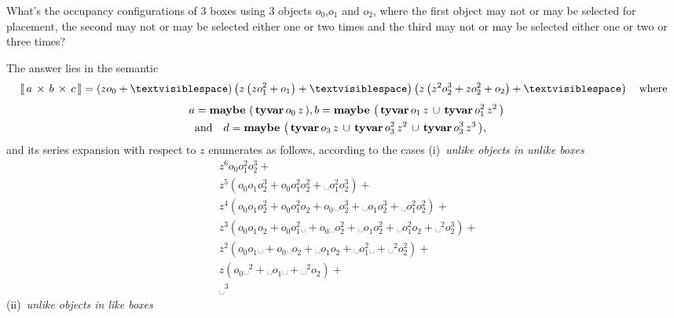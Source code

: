 \begin{example}
What's the occupancy configurations of $3$ boxes using $3$ objects
$o_{0}$,$o_{1}$ and $o_{2}$, where the first object may not or may be selected
for placement, the second may not or may be selected either one or two times
    and the third may not or may be selected either one or two or three times?

The answer lies in the semantic
\begin{displaymath}
    \semantic{\tycp{a}{\tycp{b}{c}}} = \left(z o_{0} + ␣\right) \left(z \left(z o_{1}^{2} + o_{1}\right) + ␣\right) \left(z \left(z^{2} o_{2}^{3} + z o_{2}^{2} + o_{2}\right) + ␣\right)
    \quad\text{where}
\end{displaymath}
\begin{displaymath}
\begin{split}
a&={\textbf{maybe}\,\left(\,\textbf{tyvar}\,o_{0}\,z\,\right)}, b={\textbf{maybe}\,\left(\,\textbf{tyvar}\,o_{1}\,z\,\cup\,\textbf{tyvar}\,o_{1}^{2}\,z^{2}\,\right)}\\
\quad&\text{and}\quad d={\textbf{maybe}\,\left(\,\textbf{tyvar}\,o_{3}\,z\,\cup\,\textbf{tyvar}\,o_{3}^{2}\,z^{2}\,\cup\,\textbf{tyvar}\,o_{3}^{3}\,z^{3}\,\right)},
\end{split}
\end{displaymath}
and its series expansion with respect to $z$ enumerates as follows,
according to the cases (i)~\textit{unlike objects in unlike boxes}
\begin{displaymath}
\begin{split}
&z^{6} o_{0} o_{1}^{2} o_{2}^{3} + \\
&z^{5} \left(o_{0} o_{1} o_{2}^{3} + o_{0} o_{1}^{2} o_{2}^{2} + ␣ o_{1}^{2} o_{2}^{3}\right) + \\
&z^{4} \left(o_{0} o_{1} o_{2}^{2} + o_{0} o_{1}^{2} o_{2} + o_{0} ␣ o_{2}^{3} + ␣ o_{1} o_{2}^{3} + ␣ o_{1}^{2} o_{2}^{2}\right) + \\
&z^{3} \left(o_{0} o_{1} o_{2} + o_{0} o_{1}^{2} ␣ + o_{0} ␣ o_{2}^{2} + ␣ o_{1} o_{2}^{2} + ␣ o_{1}^{2} o_{2} + ␣^{2} o_{2}^{3}\right) + \\
&z^{2} \left(o_{0} o_{1} ␣ + o_{0} ␣ o_{2} + ␣ o_{1} o_{2} + ␣ o_{1}^{2} ␣ + ␣^{2} o_{2}^{2}\right) + \\
&z \left(o_{0} ␣^{2} + ␣ o_{1} ␣ + ␣^{2} o_{2}\right) + \\
&␣^{3}
\end{split}
\end{displaymath}
(ii)~\textit{unlike objects in like boxes}
\begin{displaymath}
\begin{split}

\end{split}
\end{displaymath}
\end{example}
